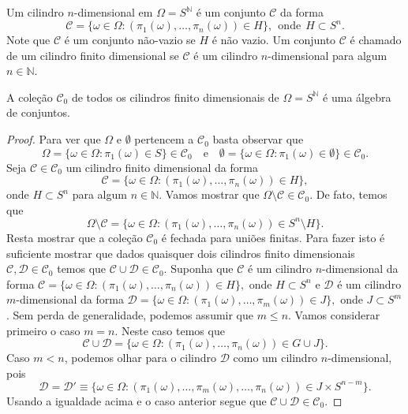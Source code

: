 Um cilindro $n$-dimensional em $\Omega=S^{\mathbb{N}}$ é um conjunto 
$\mathcal{C}$ da forma 
\[
\mathcal{C}
=
\{
\omega\in \Omega:
(\pi_1(\omega),\ldots,\pi_n(\omega)) \in H
\},
\ \ 
\text{onde}\ \ H\subset S^n.
\]
Note que $\mathcal{C}$ é um conjunto não-vazio 
se $H$ é não vazio.
Um conjunto $\mathcal{C}$ é chamado de 
um cilindro finito dimensional se $\mathcal{C}$
é um cilindro $n$-dimensional para algum $n\in\mathbb{N}$. 


\begin{lema}
A coleção $\mathscr{C}_0$ de todos os cilindros finito dimensionais de 
$\Omega = S^{\mathbb{N}}$ é uma álgebra de conjuntos.
\end{lema}

\begin{proof}
Para ver que $\Omega$ e $\emptyset$ pertencem a 
$\mathscr{C}_0$ basta observar que 
\[
\Omega 
= 
\{\omega\in \Omega: \pi_1(\omega)\in S\}
\in
\mathscr{C}_0
%
\quad
\text{e}
\quad
%
\emptyset
=
\{\omega\in \Omega: \pi_1(\omega)\in \emptyset\}
\in
\mathscr{C}_0.
\]
%
Seja $\mathcal{C}\in \mathscr{C}_0$ um cilindro finito dimensional
da forma 
$$
\mathcal{C}
=
\{
\omega\in \Omega:
(\pi_1(\omega), \ldots,\pi_n(\omega)) \in H
\},
$$
onde
$H\subset S^n$ para algum $n\in\mathbb{N}$.
Vamos mostrar que $\Omega\setminus \mathcal{C}\in \mathscr{C}_0$.
De fato, temos que 
$$
\Omega\setminus \mathcal{C}
=
\{
\omega\in \Omega:
(\pi_1(\omega), \ldots,\pi_n(\omega)) \in S^n\setminus H
\}.
$$
Resta mostrar que a coleção $\mathscr{C}_0$ é fechada 
para uniões finitas. Para fazer isto é suficiente mostrar
que dados quaisquer dois cilindros finito dimensionais 
$\mathcal{C},\mathcal{D}\in\mathscr{C}_0$ temos que 
$\mathcal{C}\cup \mathcal{D}\in\mathscr{C}_0$.
Suponha que $\mathcal{C}$ é um cilindro $n$-dimensional
da forma 
$
\mathcal{C}
=
\{\omega\in \Omega: (\pi_1(\omega),\ldots,\pi_n(\omega))\in H\},
$
onde $H\subset S^n$
e $\mathcal{D}$ é um cilindro $m$-dimensional
da forma 
$
\mathcal{D}
=
\{\omega\in \Omega: (\pi_1(\omega),\ldots,\pi_m(\omega))\in J\},
$
onde $J\subset S^m$.
Sem perda de generalidade, podemos assumir que $m\leq n$.
Vamos considerar primeiro o caso $m=n$. Neste caso 
temos que 
\[
\mathcal{C}\cup\mathcal{D}
=
\{\omega\in \Omega: (\pi_1(\omega),\ldots,\pi_n(\omega))\in G\cup J\}.
\] 
Caso $m<n$, podemos olhar para o cilindro $\mathcal{D}$
como um cilindro $n$-dimensional, pois 
\[
\mathcal{D}
=
\mathcal{D}'
\equiv 
\{
\omega\in \Omega: 
(\pi_1(\omega),\ldots,\pi_m(\omega),\ldots,\pi_n(\omega))
\in J\times S^{n-m}
\}.
\] 
Usando a igualdade acima e o caso anterior segue que 
$\mathcal{C}\cup\mathcal{D}\in\mathscr{C}_0$. 
\end{proof}



